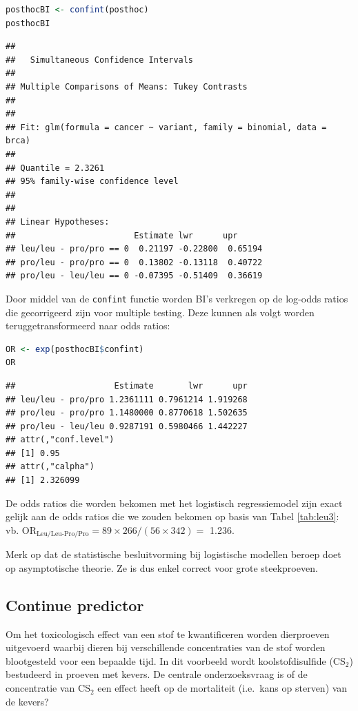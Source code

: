 \documentclass[
  12pt,dutch,coursenotes]{book}
\newcommand{\passthrough}[1]{#1}
\theoremstyle{definition}
\theoremstyle{definition}
\theoremstyle{definition}
\theoremstyle{definition}
\theoremstyle{remark}
\begin{document}
\begin{lstlisting}[language=R]
posthocBI <- confint(posthoc)
posthocBI
\end{lstlisting}

\begin{lstlisting}
## 
##   Simultaneous Confidence Intervals
## 
## Multiple Comparisons of Means: Tukey Contrasts
## 
## 
## Fit: glm(formula = cancer ~ variant, family = binomial, data = brca)
## 
## Quantile = 2.3261
## 95% family-wise confidence level
##  
## 
## Linear Hypotheses:
##                        Estimate lwr      upr     
## leu/leu - pro/pro == 0  0.21197 -0.22800  0.65194
## pro/leu - pro/pro == 0  0.13802 -0.13118  0.40722
## pro/leu - leu/leu == 0 -0.07395 -0.51409  0.36619
\end{lstlisting}

Door middel van de \passthrough{\lstinline!confint!} functie worden BI's verkregen op de log-odds ratios die gecorrigeerd zijn voor multiple testing. Deze kunnen als volgt worden teruggetransformeerd naar odds ratios:

\begin{lstlisting}[language=R]
OR <- exp(posthocBI$confint)
OR
\end{lstlisting}

\begin{lstlisting}
##                    Estimate       lwr      upr
## leu/leu - pro/pro 1.2361111 0.7961214 1.919268
## pro/leu - pro/pro 1.1480000 0.8770618 1.502635
## pro/leu - leu/leu 0.9287191 0.5980466 1.442227
## attr(,"conf.level")
## [1] 0.95
## attr(,"calpha")
## [1] 2.326099
\end{lstlisting}

De odds ratios die worden bekomen met het logistisch regressiemodel zijn exact gelijk aan de odds ratios die we zouden bekomen op basis van Tabel \ref{tab:leu3}:
vb. \(\text{OR}_\text{Leu/Leu-Pro/Pro}=89\times 266/(56\times 342)=\) 1.236.

Merk op dat de statistische besluitvorming bij logistische modellen beroep doet op asymptotische theorie. Ze is dus enkel correct voor grote steekproeven.

\hypertarget{continue-predictor}{%
\subsection{Continue predictor}\label{continue-predictor}}

Om het toxicologisch effect van een stof te kwantificeren worden dierproeven uitgevoerd waarbij dieren bij verschillende concentraties van de stof worden blootgesteld voor een bepaalde tijd. In dit voorbeeld wordt koolstofdisulfide (CS\(_2\)) bestudeerd in proeven met kevers.
De centrale onderzoeksvraag is of de concentratie van CS\(_2\) een effect heeft op de mortaliteit (i.e.~kans op sterven) van de kevers?
\end{document}
